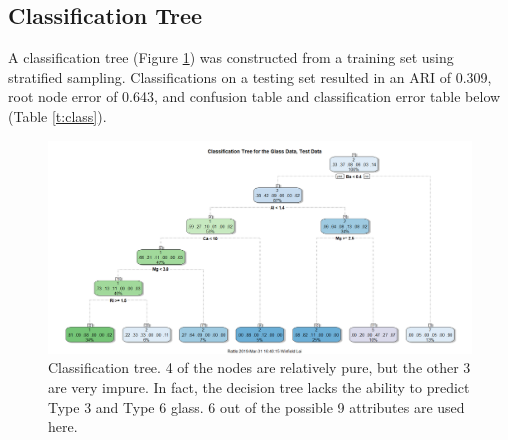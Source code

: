 \documentclass[12pt]{article}
\begin{document}
\subsection{Classification Tree}
A classification tree (Figure \ref{f:class}) was constructed from a training set using stratified sampling. Classifications on a testing set resulted in an ARI of 0.309, root node error of 0.643, and confusion table and  classification error table below (Table \ref{t:class}). 

\begin{figure}[H]
	\includegraphics[width=\linewidth]{rpart_full.png}
	\caption{
		Classification tree. 4 of the nodes are relatively pure, but the other 3 are very impure. In fact, the decision tree lacks the ability to predict Type 3 and Type 6 glass. 6 out of the possible 9 attributes are used here. 
	}
	\label{f:class}
\end{figure}
\end{document}

